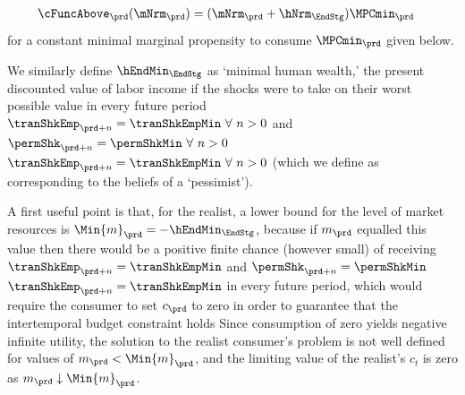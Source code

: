 \documentclass[titlepage, headings=optiontotocandhead]{econark}
\makeatletter
\newcommand{\saferlabel}[1]{%
  \ifcsname r@#1\endcsname
  \else
    \label{#1}%
  \fi
}
\makeatother
\begin{document}
  \begin{equation}\begin{gathered}\begin{aligned}
        \cFuncAbove_{\prd}(\mNrm_{\prd})  & = (\mNrm_{\prd} + \hNrm_{\EndStg})\MPCmin_{\prd} \saferlabel{eq:cFuncAbove} %
      \end{aligned}\end{gathered}\end{equation}
  for a constant minimal marginal propensity to consume $\MPCmin_{\prd}$ given below.



  We similarly define $\hEndMin_{\EndStg}$ as `minimal human wealth,' the
  present discounted value of labor income if the shocks were to take on
  their worst possible value in every future period \PermShkOn
  {$\tranShkEmp_{\prd+n} = \tranShkEmpMin ~\forall~n>0$ and $\permShk_{\prd+n} =
    \permShkMin ~\forall~n>0$} {$\tranShkEmp_{\prd+n} = \tranShkEmpMin
    ~\forall~n>0$} (which we define as corresponding to the beliefs of a
  `pessimist').


  A first useful point is that, for the realist, a lower bound for the
  level of market resources is $\Min{m}_{\prd} = -\hEndMin_{\EndStg}$, because
  if $m_{\prd}$ equalled this value then there would be a positive finite
  chance (however small) of receiving \PermShkOn
  {$\tranShkEmp_{\prd+n}=\tranShkEmpMin$ and $\permShk_{\prd+n}=\permShkMin$}
  {$\tranShkEmp_{\prd+n}=\tranShkEmpMin$}
  in
  every future period, which would require the consumer to set $c_{\prd}$
  to zero in order to guarantee that the intertemporal budget constraint
  holds  Since consumption of zero yields negative
  infinite utility, the solution to the realist consumer's problem is not well
  defined for values of $m_{\prd} < \Min{m}_{\prd}$, and the limiting
  value of the realist's $c_t$ is zero as $m_{\prd} \downarrow \Min{m}_{\prd}$.
\end{document}
